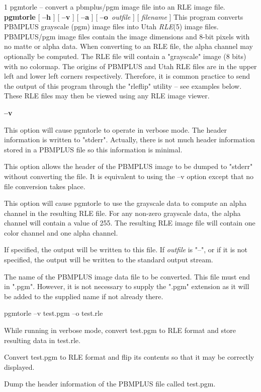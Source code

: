 %
%
%
 1
pgmtorle -- convert a pbmplus/pgm image file into an RLE image file.
{\bf pgmtorle}
[
{\bf --h}
] [
{\bf --v}
] [
{\bf --a}
] [
{\bf --o}{\it \ outfile}
] [
{\it filename}
]
This program converts PBMPLUS grayscale (pgm) image files into Utah
{\it RLE}{\rm (5)}
image files.  PBMPLUS/pgm image files contain the image dimensions and 8-bit
pixels with no matte or alpha data.  When converting to an RLE file, the alpha
channel may optionally be computed.  The RLE file will contain a "grayscale"
image (8 bits) with no colormap.  The origins of PBMPLUS and Utah RLE files
are in the upper left and lower left corners respectively.  Therefore, it is
common practice to send the output of this program through the "rleflip"
utility -- see examples below.  These RLE files may then be viewed using any
RLE image viewer.
\par
{}
\begin{TPlist}{{\bf --v}}
\item[{{\bf --v}}]
This option will cause pgmtorle to operate in verbose mode.  The header
information is written to "stderr".  Actually, there is not much header
information stored in a PBMPLUS file so this information is minimal.
\item[{{\bf --h}}]
This option allows the header of the PBMPLUS image to be dumped to "stderr"
without converting the file.  It is equivalent to using the --v option except
that no file conversion takes place.
\item[{{\bf --a}}]
This option will cause pgmtorle to use the grayscale data to compute an alpha
channel in the resulting RLE file.  For any non-zero grayscale data, the alpha
channel will contain a value of 255.  The resulting RLE image file will
contain one color channel and one alpha channel.
\item[{{\bf --o}{\it \ outfile}
}]
If specified, the output will be written to this file.  If 
{\it outfile}
is "--", or if it is not specified, the output will be written to the
standard output stream.
\item[{{\it infile.pgm}}]
The name of the PBMPLUS image data file to be converted.  This file must end
in ".pgm".  However, it is not necessary to supply the ".pgm" extension as it
will be added to the supplied name if not already there.
\end{TPlist}
\begin{TPlist}{pgmtorle --v test.pgm --o test.rle}
\item[{pgmtorle --v test.pgm --o test.rle}]
While running in verbose mode, convert test.pgm to RLE format and store
resulting data in test.rle.
\item[{pgmtorle test $|$ rleflip --v $>$test.rle}]
Convert test.pgm to RLE format and flip its contents so that it may be
correctly displayed.
\item[{pgmtorle --h test}]
Dump the header information of the PBMPLUS file called test.pgm.
\end{TPlist}
